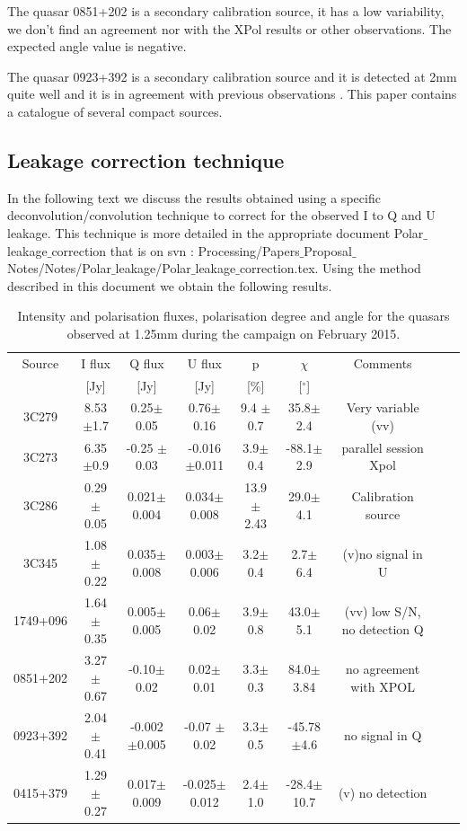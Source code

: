 \documentclass[a4paper,10pt]{article}
\begin{document}
The quasar 0851+202 is a secondary calibration source, it has a low variability, we don't find an agreement nor with the XPol results or other observations. The expected angle value is negative. 

The quasar 0923+392 is a secondary calibration source and it is detected at 2mm quite well and it is in agreement with previous observations \cite{nartallo}. This paper contains a catalogue of several compact sources.

\subsection{Leakage correction technique}
In the following text we discuss the results obtained using a specific deconvolution/convolution technique to correct for the observed I to Q and U leakage. This technique is more detailed in the appropriate document Polar$\_$leakage$\_$correction that is on svn : Processing/Papers$\_$Proposal$\_$Notes/Notes/Polar$\_$leakage/Polar$\_$leakage$\_$correction.tex.
Using the method described in this document we obtain the following results. 

\begin{table}[h!]
\caption{Intensity and polarisation fluxes, polarisation degree and angle for the quasars observed at 1.25mm during the campaign on February 2015.}
\begin{center}
\begin{tabular}{ccccccccc}
\hline
\hline
Source & I flux & Q flux &  U flux  & p & $\chi$ & Comments\\
 & [Jy] & [Jy] & [Jy] & [\%] & [$^\circ$]\\
\hline
3C279 &  8.53$\pm$1.7 &  0.25$\pm$0.05 & 0.76$\pm$0.16 & 9.4 $\pm$ 0.7 & 35.8$\pm$2.4 & Very variable (vv)\\
3C273 &  6.35 $\pm$0.9 & -0.25 $\pm$ 0.03 & -0.016 $\pm$0.011 &  3.9$\pm$0.4 & -88.1$\pm$2.9 & parallel session Xpol\\
3C286 &  0.29$\pm$0.05 & 0.021$\pm$0.004 & 0.034$\pm$0.008 & 13.9$\pm$2.43 & 29.0$\pm$4.1 & Calibration source\\
3C345 &  1.08$\pm$0.22 & 0.035$\pm$0.008 & 0.003$\pm$ 0.006 & 3.2$\pm$ 0.4 & 2.7$\pm$ 6.4& (v)no signal in U\\
1749+096 & 1.64$\pm$0.35 & 0.005$\pm$0.005 & 0.06$\pm$0.02 &  3.9$\pm$0.8 & 43.0$\pm$5.1 & (vv) low S/N, no detection Q \\
0851+202 & 3.27$\pm$0.67 & -0.10$\pm$0.02 &  0.02$\pm$0.01 & 3.3$\pm$0.3 & 84.0$\pm$3.84 & no agreement with XPOL\\
0923+392 & 2.04$\pm$0.41 & -0.002 $\pm$0.005 & -0.07 $\pm$ 0.02 & 3.3$\pm$0.5 & -45.78$\pm$4.6 & no signal in Q\\
0415+379 & 1.29$\pm$0.27 & 0.017$\pm$0.009 & -0.025$\pm$0.012 & 2.4$\pm$1.0 &  -28.4$\pm$10.7 &(v) no detection\\
\hline
\end{tabular}
\end{center}
\label{tab:tab_quasar_1mm}
\end{table}
\end{document}
